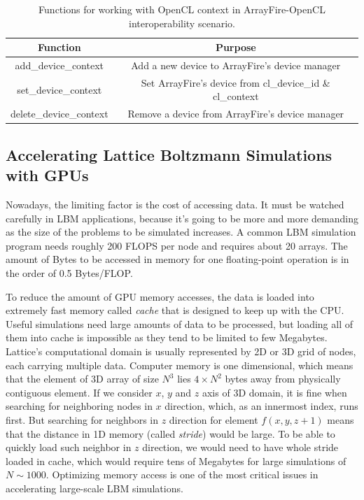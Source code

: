 \begin{table}[h!]
	\centering
	\begin{tabular}{||c c||} 
		\hline
		Function & Purpose \\ [0.5ex] 
		\hline\hline
		add_device_context & Add a new device to ArrayFire's device manager \\ 
		set_device_context & Set ArrayFire's device from cl_device_id \& cl_context \\
		delete_device_context & Remove a device from ArrayFire's device manager \\
		\hline
	\end{tabular}
	\caption{Functions for working with OpenCL context in ArrayFire-OpenCL interoperability scenario.}
	\label{table:afcl}
\end{table}

\subsection{Accelerating Lattice Boltzmann Simulations with GPUs}



Nowadays, the limiting factor is the cost of accessing data. It must be watched carefully in LBM applications, because it's going to be more and more demanding as the size of the problems to be simulated increases. A common LBM simulation program needs roughly 200 FLOPS per node and requires about 20 arrays. The amount of Bytes to be accessed in memory for one floating-point operation is in the order of 0.5 Bytes/FLOP. 

To reduce the amount of GPU memory accesses, the data is loaded into extremely fast memory called \emph{cache} that is designed to keep up with the CPU. Useful simulations need large amounts of data to be processed, but loading all of them into cache is impossible as they tend to be limited to few Megabytes. Lattice's computational domain is usually represented by 2D or 3D grid of nodes, each carrying multiple data. Computer memory is one dimensional, which means that the element of 3D array of size $N^3$ lies $4 \times N^2$ bytes away from physically contiguous element. If we consider $x$, $y$ and $z$ axis of 3D domain, it is fine when searching for neighboring nodes in $x$ direction, which, as an innermost index, runs first. But searching for neighbors in $z$ direction for element $f(x,y,z+1)$ means that the distance in 1D memory (called \emph{stride}) would be large. To be able to quickly load such neighbor in $z$ direction, we would need to have whole stride loaded in cache, which would require tens of Megabytes for large simulations of $N \sim 1000$. Optimizing memory access is one of the most critical issues in accelerating large-scale LBM simulations.


